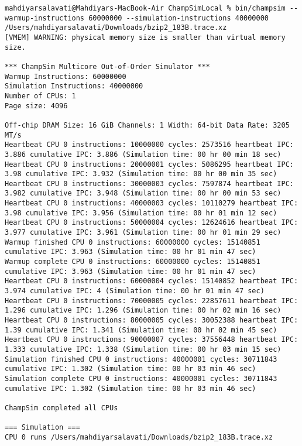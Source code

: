 \documentclass[17pt]{article}
\begin{document}
\begin{LTR}
\begin{lstlisting}[basicstyle=\tiny\ttfamily]
mahdiyarsalavati@Mahdiyars-MacBook-Air ChampSimLocal % bin/champsim --warmup-instructions 60000000 --simulation-instructions 40000000 /Users/mahdiyarsalavati/Downloads/bzip2_183B.trace.xz
[VMEM] WARNING: physical memory size is smaller than virtual memory size.

*** ChampSim Multicore Out-of-Order Simulator ***
Warmup Instructions: 60000000
Simulation Instructions: 40000000
Number of CPUs: 1
Page size: 4096

Off-chip DRAM Size: 16 GiB Channels: 1 Width: 64-bit Data Rate: 3205 MT/s
Heartbeat CPU 0 instructions: 10000000 cycles: 2573516 heartbeat IPC: 3.886 cumulative IPC: 3.886 (Simulation time: 00 hr 00 min 18 sec)
Heartbeat CPU 0 instructions: 20000001 cycles: 5086295 heartbeat IPC: 3.98 cumulative IPC: 3.932 (Simulation time: 00 hr 00 min 35 sec)
Heartbeat CPU 0 instructions: 30000003 cycles: 7597874 heartbeat IPC: 3.982 cumulative IPC: 3.948 (Simulation time: 00 hr 00 min 53 sec)
Heartbeat CPU 0 instructions: 40000003 cycles: 10110279 heartbeat IPC: 3.98 cumulative IPC: 3.956 (Simulation time: 00 hr 01 min 12 sec)
Heartbeat CPU 0 instructions: 50000004 cycles: 12624616 heartbeat IPC: 3.977 cumulative IPC: 3.961 (Simulation time: 00 hr 01 min 29 sec)
Warmup finished CPU 0 instructions: 60000000 cycles: 15140851 cumulative IPC: 3.963 (Simulation time: 00 hr 01 min 47 sec)
Warmup complete CPU 0 instructions: 60000000 cycles: 15140851 cumulative IPC: 3.963 (Simulation time: 00 hr 01 min 47 sec)
Heartbeat CPU 0 instructions: 60000004 cycles: 15140852 heartbeat IPC: 3.974 cumulative IPC: 4 (Simulation time: 00 hr 01 min 47 sec)
Heartbeat CPU 0 instructions: 70000005 cycles: 22857611 heartbeat IPC: 1.296 cumulative IPC: 1.296 (Simulation time: 00 hr 02 min 16 sec)
Heartbeat CPU 0 instructions: 80000005 cycles: 30052388 heartbeat IPC: 1.39 cumulative IPC: 1.341 (Simulation time: 00 hr 02 min 45 sec)
Heartbeat CPU 0 instructions: 90000007 cycles: 37556448 heartbeat IPC: 1.333 cumulative IPC: 1.338 (Simulation time: 00 hr 03 min 15 sec)
Simulation finished CPU 0 instructions: 40000001 cycles: 30711843 cumulative IPC: 1.302 (Simulation time: 00 hr 03 min 46 sec)
Simulation complete CPU 0 instructions: 40000001 cycles: 30711843 cumulative IPC: 1.302 (Simulation time: 00 hr 03 min 46 sec)

ChampSim completed all CPUs

=== Simulation ===
CPU 0 runs /Users/mahdiyarsalavati/Downloads/bzip2_183B.trace.xz


\end{lstlisting}
\end{LTR}
\end{document}
